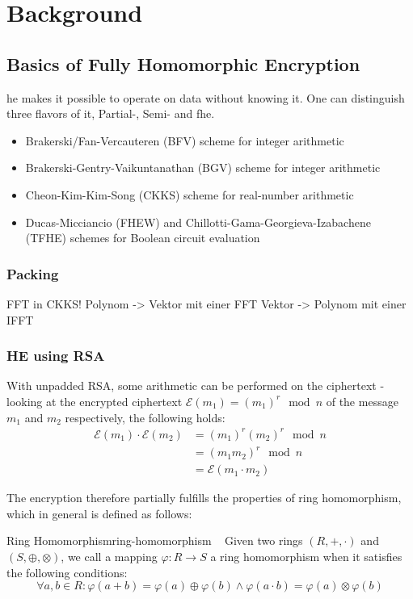 \chapter{Background}
\label{chap:background}

\section{Basics of Fully Homomorphic Encryption}
\gls{he} makes it possible to operate on data without knowing it.
One can distinguish three flavors of it, Partial-, Semi- and \gls{fhe}.

\begin{itemize}
  \item Brakerski/Fan-Vercauteren (BFV) scheme for integer arithmetic
  \item Brakerski-Gentry-Vaikuntanathan (BGV) scheme for integer arithmetic
  \item Cheon-Kim-Kim-Song (CKKS) scheme for real-number arithmetic
  \item Ducas-Micciancio (FHEW) and Chillotti-Gama-Georgieva-Izabachene (TFHE) schemes for Boolean circuit evaluation
\end{itemize}

\subsection{Packing}
FFT in CKKS!
Polynom -> Vektor mit einer FFT
Vektor -> Polynom mit einer IFFT

\subsection{HE using RSA}
With unpadded RSA, some arithmetic can be performed on the ciphertext - looking at the encrypted ciphertext $\mathcal{E}(m_1) = (m_1)^r \mod n$ of the message $m_1$ and $m_2$ respectively, the following holds:
\begin{align}
  \mathcal{E}(m_1) \cdot \mathcal{E}(m_2)
   & = (m_1)^r (m_2)^r \mod n     \\
   & = (m_1 m_2)^r \mod n         \\
   & = \mathcal{E}(m_1 \cdot m_2)
\end{align}

The encryption therefore partially fulfills the properties of ring homomorphism, which in general is defined as follows:

\begin{definition}{Ring Homomorphism}{ring-homomorphism} ~
  Given two rings $(R, +, \cdot)$ and $(S, \oplus, \otimes)$, we call a mapping $\varphi: R \rightarrow S$ a ring homomorphism when it satisfies the following conditions:
  $$\forall a, b \in R: \varphi(a + b) = \varphi(a) \oplus \varphi(b) \wedge \varphi(a \cdot b) = \varphi(a) \otimes \varphi(b)$$
\end{definition}

